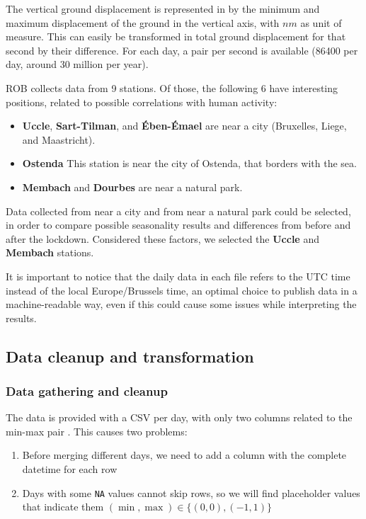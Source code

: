 \documentclass[12pt]{article}
\begin{document}
The vertical ground displacement is represented in by the minimum and maximum displacement of the ground in the vertical axis, with $nm$ as unit of measure. This can easily be transformed in total ground displacement for that second by their difference.
For each day, a pair per second is available (86400 per day, around 30 million per year).

ROB collects data from 9 stations. Of those, the following 6 have interesting positions, related to possible correlations with human activity:
\begin{itemize}[topsep=0.5em,itemsep=0em,partopsep=0.5em]
	\item \textbf{Uccle}, \textbf{Sart-Tilman}, and \textbf{Ében-Émael} are near a city (Bruxelles, Liege, and Maastricht).
	\item \textbf{Ostenda} This station is near the city of Ostenda, that borders with the sea.
	\item \textbf{Membach} and \textbf{Dourbes} are near a natural park.
\end{itemize}

Data collected from near a city and from near a natural park could be selected, in order to compare possible seasonality results and differences from before and after the lockdown. %
Considered these factors, we selected the \textbf{Uccle} and \textbf{Membach} stations.

It is important to notice that the daily data in each file refers to the UTC time instead of the local Europe/Brussels time, an optimal choice to publish data in a machine-readable way, even if this could cause some issues while interpreting the results.

\subsection{Data cleanup and transformation}\label{sec:cleanup-transform}
\subsubsection{Data gathering and cleanup}
The data is provided with a CSV per day, with only two columns related to the min-max pair \cite{Data20200402}. This causes two problems:
\begin{enumerate}[topsep=0.5em,itemsep=0em,partopsep=0.5em]
	\item Before merging different days, we need to add a column with the complete datetime for each row
	\item Days with some \texttt{NA} values cannot skip rows, so we will find placeholder values that indicate them $(\min, \max) \in \{(0,0), (-1,1)\}$
\end{enumerate}
\end{document}
